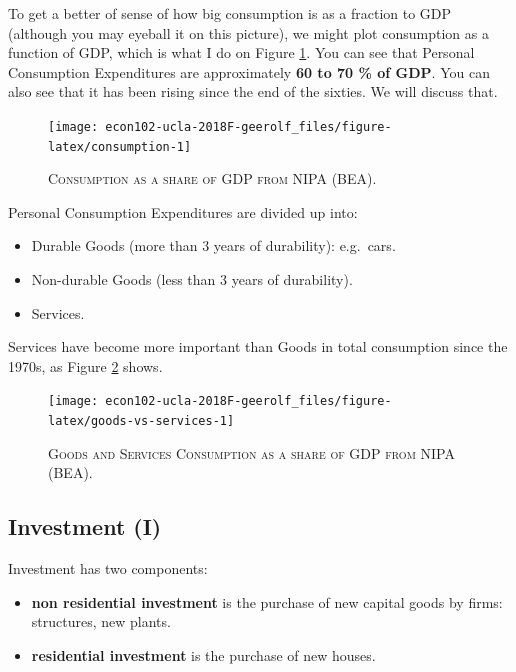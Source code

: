 \documentclass[]{book}
\providecommand{\tightlist}{%
  \setlength{\itemsep}{0pt}\setlength{\parskip}{0pt}}
\begin{document}
To get a better of sense of how big consumption is as a fraction to GDP
(although you may eyeball it on this picture), we might plot consumption
as a function of GDP, which is what I do on Figure
\ref{fig:consumption}. You can see that Personal Consumption
Expenditures are approximately \textbf{60 to 70 \% of GDP}. You can also
see that it has been rising since the end of the sixties. We will
discuss that.




\begin{figure}

{\centering \texttt{[image: econ102-ucla-2018F-geerolf\_files/figure-latex/consumption-1]} 

}

\caption{\textsc{Consumption as a share of GDP from NIPA
(BEA)}.}\label{fig:consumption}
\end{figure}

Personal Consumption Expenditures are divided up into:

\begin{itemize}
\tightlist
\item
  Durable Goods (more than 3 years of durability): e.g.~cars.
\item
  Non-durable Goods (less than 3 years of durability).
\item
  Services.
\end{itemize}

Services have become more important than Goods in total consumption
since the 1970s, as Figure \ref{fig:goods-vs-services} shows.




\begin{figure}

{\centering \texttt{[image: econ102-ucla-2018F-geerolf\_files/figure-latex/goods-vs-services-1]} 

}

\caption{\textsc{Goods and Services Consumption as
a share of GDP from NIPA (BEA)}.}\label{fig:goods-vs-services}
\end{figure}

\subsection{Investment (I)}\label{inv}

Investment has two components:

\begin{itemize}
\tightlist
\item
  \textbf{non residential investment} is the purchase of new capital
  goods by firms: structures, new plants.
\item
  \textbf{residential investment} is the purchase of new houses.
\end{itemize}
\end{document}
